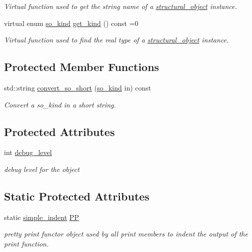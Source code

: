 \begin{DoxyCompactItemize}
\begin{DoxyCompactList}\small\item\em Virtual function used to get the string name of a \hyperlink{classstructural__object}{structural\+\_\+object} instance. \end{DoxyCompactList}\item 
virtual enum \hyperlink{structural__objects_8hpp_acf52399aecacb7952e414c5746ce6439}{so\+\_\+kind} \hyperlink{classstructural__object_ad9f487c3b7774ecd4e2f55979c434cd0}{get\+\_\+kind} () const =0
\begin{DoxyCompactList}\small\item\em Virtual function used to find the real type of a \hyperlink{classstructural__object}{structural\+\_\+object} instance. \end{DoxyCompactList}\end{DoxyCompactItemize}
\subsection*{Protected Member Functions}
\begin{DoxyCompactItemize}
\item 
std\+::string \hyperlink{classstructural__object_a9cae0eae58b6f33a704cef27ed551692}{convert\+\_\+so\+\_\+short} (\hyperlink{structural__objects_8hpp_acf52399aecacb7952e414c5746ce6439}{so\+\_\+kind} in) const
\begin{DoxyCompactList}\small\item\em Convert a so\+\_\+kind in a short string. \end{DoxyCompactList}\end{DoxyCompactItemize}
\subsection*{Protected Attributes}
\begin{DoxyCompactItemize}
\item 
int \hyperlink{classstructural__object_ac2744292aa7f0fca3742133d16bb3201}{debug\+\_\+level}
\begin{DoxyCompactList}\small\item\em debug level for the object \end{DoxyCompactList}\end{DoxyCompactItemize}
\subsection*{Static Protected Attributes}
\begin{DoxyCompactItemize}
\item 
static \hyperlink{classsimple__indent}{simple\+\_\+indent} \hyperlink{classstructural__object_ae310104d0f3515966905919d32a08efa}{PP}
\begin{DoxyCompactList}\small\item\em pretty print functor object used by all print members to indent the output of the print function. \end{DoxyCompactList}\end{DoxyCompactItemize}
